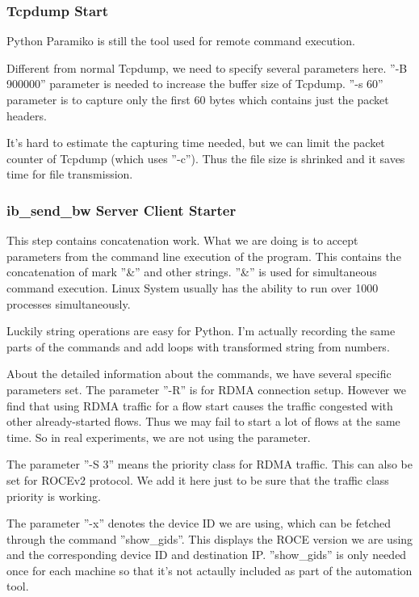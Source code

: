 \documentclass[12pt,a4paper]{article}
\begin{document}
\subsubsection{Tcpdump Start}
Python Paramiko is still the tool used for remote command execution.

Different from normal Tcpdump, we need to specify several parameters here.
''-B 900000'' parameter is needed to increase the buffer size of Tcpdump.
''-s 60'' parameter is to capture only the first 60 bytes which contains just the packet headers.

It's hard to estimate the capturing time needed, but we can limit the packet counter of Tcpdump (which uses ''-c'').
Thus the file size is shrinked and it saves time for file transmission.

\subsubsection{ib\_send\_bw Server Client Starter}

This step contains concatenation work.
What we are doing is to accept parameters from the command line execution of the program.
This contains the concatenation of mark ''\&'' and other strings.
''\&'' is used for simultaneous command execution. Linux System usually has the ability to run over 1000 processes simultaneously.

Luckily string operations are easy for Python.
I'm actually recording the same parts of the commands and add loops with transformed string from numbers.

About the detailed information about the commands, we have several specific parameters set.
The parameter ''-R'' is for RDMA connection setup. However we find that using RDMA traffic for a flow start causes
the traffic congested with other already-started flows. Thus we may fail to start a lot of flows at the same time.
So in real experiments, we are not using the parameter.

The parameter ''-S 3'' means the priority class for RDMA traffic. This can also be set for ROCEv2 protocol.
We add it here just to be sure that the traffic class priority is working.

The parameter ''-x'' denotes the device ID we are using, which can be fetched through the command ''show\_gids''.
This displays the ROCE version we are using and the corresponding device ID and destination IP.
''show\_gids'' is only needed once for each machine so that it's not actaully included as part of the automation tool.
\end{document}
